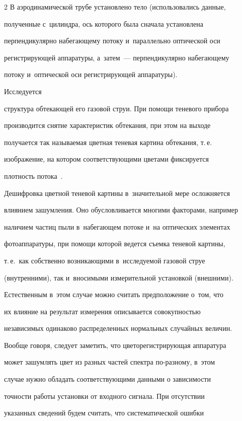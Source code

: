 \begin{multicols}{2}
В аэродинамической трубе установлено тело (использовались данные,

полученные с~цилиндра, ось которого была сначала установлена

перпендикулярно набегающему потоку и~параллельно оптической оси

регистрирующей аппаратуры, а~затем~--- перпендикулярно набегающему

потоку и~оптической оси регистрирующей аппаратуры). 



Исследуется

структура обтекающей его газовой струи. При помощи теневого прибора

производится снятие характеристик обтекания, при этом на выходе

получается так называемая цветная теневая картина обтекания, т.\,е.\

изображение, на котором соответствующими цветами фиксируется

плотность потока~\cite{holder,krasnov,Eng_dis_m, Rus_dis_m}.



Дешифровка цветной теневой картины в~значительной мере осложняется

влиянием зашумления. Оно обусловливается многими факторами, например

наличием частиц пыли в~набегающем потоке и~на оптических элементах

фотоаппаратуры, при помощи которой ведется съемка теневой картины,

т.\,е.\ как собственно возникающими в~исследуемой газовой струе

(внутренними), так и~вносимыми измерительной установкой (внешними).

Естественным в~этом случае можно считать предположение о~том, что

их влияние на результат измерения описывается совокупностью

независимых одинаково распределенных  нормальных случайных величин.

Вообще говоря, следует заметить, что цветорегистрирующая аппаратура

может зашумлять цвет из разных частей спектра по-разному, в~этом

случае нужно обладать соответствующими данными о зависимости

точности работы установки от входного сигнала. При отсутствии

указанных сведений будем считать, что систематической ошибки


\end{multicols}
